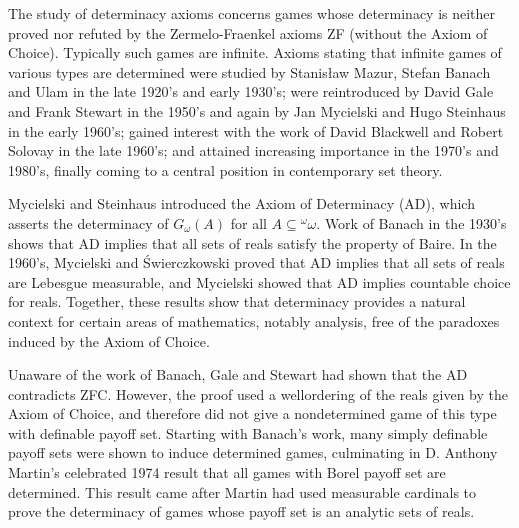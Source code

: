 \documentclass{book}%
\newcommand{\breals}{{^{\omega}}\omega}
\begin{document}
The study of determinacy axioms
concerns games whose determinacy is neither proved nor refuted by
the Zermelo-Fraenkel axioms ZF (without the Axiom of Choice). Typically such games are
infinite. Axioms
stating that infinite games of various types are determined were studied by Stanis{\l}aw Mazur, Stefan Banach and Ulam in
the late 1920's and early 1930's; were reintroduced by David Gale and Frank Stewart  in the 1950's and again by Jan Mycielski and Hugo Steinhaus  in the early 1960's; gained interest with the work of
David Blackwell  and Robert Solovay in the late 1960's; and attained increasing importance in the 1970's and 1980's, finally coming to a central position in
contemporary set theory.

Mycielski and Steinhaus introduced the
Axiom of Determinacy (AD),
which asserts
the determinacy of $G_{\omega}(A)$ for all $A \subseteq \breals$. Work of
Banach in the 1930's shows that AD implies that all sets of reals satisfy the property
of Baire. In the 1960's, Mycielski and \'{S}wierczkowski proved that AD implies
that all sets of reals are Lebesgue measurable, and Mycielski showed that AD implies
countable choice for reals. Together, these results show that determinacy provides a natural
context for certain areas of mathematics, notably analysis, free of the paradoxes induced
by the Axiom of Choice.

Unaware of the work of Banach, Gale and Stewart 
had shown that the AD contradicts ZFC. However, the
proof used a wellordering of the reals given by the Axiom of Choice,
and therefore did not give a nondetermined game of this type with
definable payoff set. Starting with Banach's work, many simply definable
payoff sets were shown to induce determined games, culminating in
D. Anthony Martin's celebrated 1974 result  that all games
with Borel  payoff set are determined. This result came after Martin had used measurable
cardinals to prove the determinacy of games whose payoff set is an analytic sets of reals.
\end{document}
